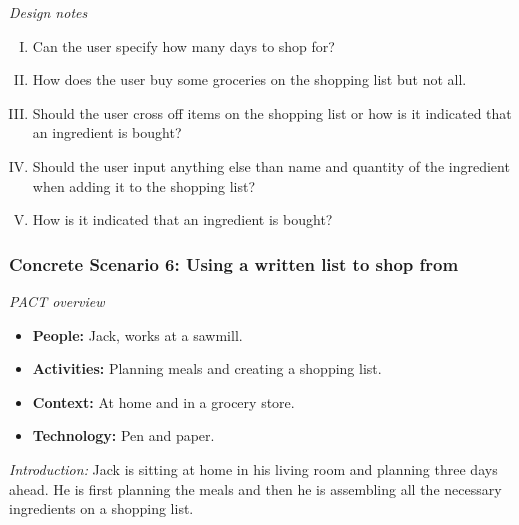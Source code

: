 \emph{Design notes}

\begin{enumerate} [(I)]
\item Can the user specify how many days to shop for?
\item How does the user buy some groceries on the shopping list but not all.
\item Should the user cross off items on the shopping list or how is it indicated that an ingredient is bought?
\item Should the user input anything else than name and quantity of the ingredient when adding it to the shopping list?
\item How is it indicated that an ingredient is bought?
\end{enumerate}

\subsubsection{Concrete Scenario 6: Using a written list to shop from} \label{ConcreteScenario6}

\emph{PACT overview}
\begin{itemize}
\item \textbf{People:} Jack, works at a sawmill.
\item \textbf{Activities:} Planning meals and creating a shopping list.
\item \textbf{Context:} At home and in a grocery store.
\item \textbf{Technology:} Pen and paper.
\end{itemize}

\emph{Introduction:} Jack is sitting at home in his living room and planning three days ahead. He is first planning the meals and then he is assembling all the necessary ingredients on a shopping list. 

